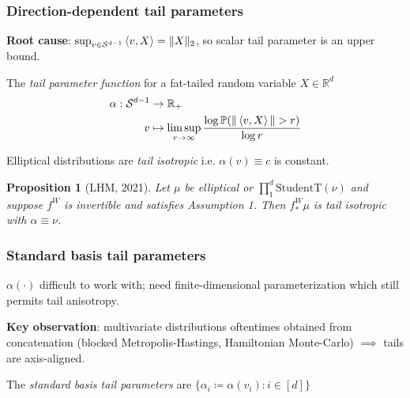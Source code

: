 \documentclass{beamer}
\newcommand{\RR}{\mathbb{R}}
\newcommand{\cS}{\mathcal{S}}
\newtheorem{proposition}[theorem]{Proposition}
\begin{document}
\begin{frame}
    \frametitle{Direction-dependent tail parameters}

    \textbf{Root cause}: $\sup_{v \in \cS^{d-1}} \braket{v,X} = \|X\|_2$, so
    scalar tail parameter is an upper bound.

    \begin{definition}
        The \emph{tail parameter function}
        for a fat-tailed random variable $X \in \RR^d$
        \begin{align*}
            \alpha : \cS^{d-1} & \to \RR_+                                                                      \\
            v                  & \mapsto \limsup_{r\to\infty} \frac{\log\mathbb{P}(\|\braket{v,X}\|>r)}{\log r}
        \end{align*}
    \end{definition}

    \begin{example}
        Elliptical distributions are \emph{tail isotropic} i.e. $\alpha(v) \equiv c$ is constant.
    \end{example}

    \begin{proposition}[LHM, 2021]
        Let $\mu$ be elliptical or $\prod_1^d \text{StudentT}(\nu)$
        and suppose $f^W$ is invertible and satisfies Assumption 1.
        Then $f^W_* \mu$ is tail isotropic with $\alpha \equiv \nu$.
    \end{proposition}
\end{frame}

\begin{frame}
    \frametitle{Standard basis tail parameters}

    $\alpha(\cdot)$ difficult to work with; need finite-dimensional parameterization which
    still permits tail anisotropy.

    \vspace{.5cm}

    \textbf{Key observation}: multivariate distributions oftentimes obtained from concatenation
    (blocked Metropolis-Hastings, Hamiltonian Monte-Carlo) $\implies$ tails are axis-aligned.

    \vspace{.5cm}


    \begin{definition}
        The \emph{standard basis tail parameters} are $\{\alpha_i \coloneqq \alpha(v_i) : i \in [d]\}$
    \end{definition}


\end{frame}
\end{document}
